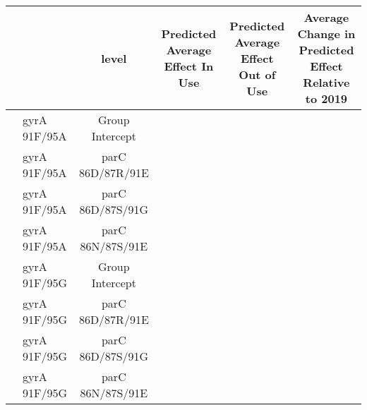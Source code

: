 \begingroup
\fontsize{5.2pt}{6.3pt}\selectfont
\begin{longtable}{l|l|cccc}
\toprule
\multicolumn{2}{c}{} & level & Predicted Average Effect In Use & Predicted Average Effect Out of Use & Average Change in Predicted Effect Relative to 2019 \\ 
\midrule\addlinespace[2.5pt]
\multirow{8}{=}{gyrA} & gyrA 91F/95A & Group Intercept & {\cellcolor[HTML]{808080}{\textcolor[HTML]{FFFFFF}{0.24 (-0.53, 0.98)}}} & {\cellcolor[HTML]{808080}{\textcolor[HTML]{FFFFFF}{0.35 (-0.35, 0.96)}}} & {\cellcolor[HTML]{808080}{\textcolor[HTML]{FFFFFF}{-0.12 (-0.53, 0.32)}}} \\ 
 & gyrA 91F/95A & parC 86D/87R/91E & {\cellcolor[HTML]{808080}{\textcolor[HTML]{FFFFFF}{0.40 (-0.31, 1.13)}}} & {\cellcolor[HTML]{FDE725}{\textcolor[HTML]{000000}{0.52 (0.23, 0.79)}}} & {\cellcolor[HTML]{808080}{\textcolor[HTML]{FFFFFF}{-0.13 (-0.79, 0.55)}}} \\ 
 & gyrA 91F/95A & parC 86D/87S/91G & {\cellcolor[HTML]{808080}{\textcolor[HTML]{FFFFFF}{0.24 (-1.08, 1.54)}}} & {\cellcolor[HTML]{808080}{\textcolor[HTML]{FFFFFF}{0.36 (-0.87, 1.45)}}} & {\cellcolor[HTML]{808080}{\textcolor[HTML]{FFFFFF}{-0.12 (-0.75, 0.56)}}} \\ 
 & gyrA 91F/95A & parC 86N/87S/91E & {\cellcolor[HTML]{808080}{\textcolor[HTML]{FFFFFF}{0.09 (-0.24, 0.43)}}} & {\cellcolor[HTML]{440154}{\textcolor[HTML]{FFFFFF}{0.24 (0.01, 0.48)}}} & {\cellcolor[HTML]{808080}{\textcolor[HTML]{FFFFFF}{-0.15 (-0.49, 0.18)}}} \\ 
 & gyrA 91F/95G & Group Intercept & {\cellcolor[HTML]{808080}{\textcolor[HTML]{FFFFFF}{0.13 (-0.54, 0.99)}}} & {\cellcolor[HTML]{808080}{\textcolor[HTML]{FFFFFF}{-0.20 (-0.78, 0.62)}}} & {\cellcolor[HTML]{808080}{\textcolor[HTML]{FFFFFF}{0.34 (-0.07, 0.66)}}} \\ 
 & gyrA 91F/95G & parC 86D/87R/91E & {\cellcolor[HTML]{808080}{\textcolor[HTML]{FFFFFF}{0.10 (-0.13, 0.30)}}} & {\cellcolor[HTML]{440154}{\textcolor[HTML]{FFFFFF}{-0.26 (-0.47, -0.05)}}} & {\cellcolor[HTML]{FDE725}{\textcolor[HTML]{000000}{0.37 (0.16, 0.57)}}} \\ 
 & gyrA 91F/95G & parC 86D/87S/91G & {\cellcolor[HTML]{808080}{\textcolor[HTML]{FFFFFF}{0.18 (-0.86, 1.36)}}} & {\cellcolor[HTML]{808080}{\textcolor[HTML]{FFFFFF}{-0.19 (-1.05, 0.92)}}} & {\cellcolor[HTML]{808080}{\textcolor[HTML]{FFFFFF}{0.37 (-0.18, 0.98)}}} \\ 
 & gyrA 91F/95G & parC 86N/87S/91E & {\cellcolor[HTML]{808080}{\textcolor[HTML]{FFFFFF}{0.19 (-0.77, 1.35)}}} & {\cellcolor[HTML]{808080}{\textcolor[HTML]{FFFFFF}{-0.17 (-1.05, 0.89)}}} & {\cellcolor[HTML]{808080}{\textcolor[HTML]{FFFFFF}{0.37 (-0.07, 0.93)}}} \\ 

\end{longtable}
